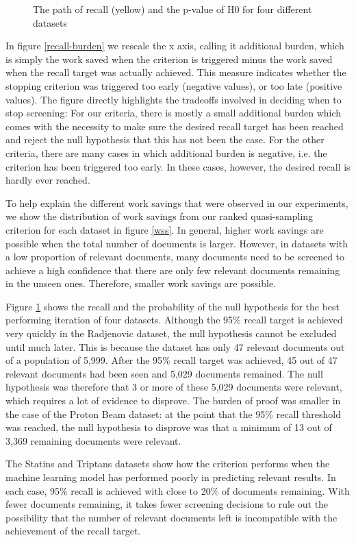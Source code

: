 \documentclass{bmcart}
\begin{document}
\begin{figure}
		\caption{\small The path of recall (yellow) and the p-value of H0 for four different datasets} 
		\label{H0paths}
	\end{figure}
	
	In figure \ref{recall-burden} we rescale the x axis, calling it additional burden, which is simply the work saved when the criterion is triggered minus the work saved when the recall target was actually achieved. This measure indicates whether the stopping criterion was triggered too early (negative values), or too late (positive values). The figure directly highlights the tradeoffs involved in deciding when to stop screening: For our criteria, there is mostly a small additional burden which comes with the necessity to make sure the desired recall target has been reached and reject the null hypothesis that this has not been the case. For the other criteria, there are many cases in which additional burden is negative, i.e. the criterion has been triggered too early. In these cases, however, the desired recall is hardly ever reached.
	
	To help explain the different work savings that were observed in our experiments, we show the distribution of work savings from our ranked quasi-sampling criterion for each dataset in figure \ref{wss}. In general, higher work savings are possible when the total number of documents is larger. However, in datasets with a low proportion of relevant documents, many documents need to be screened to achieve a high confidence that there are only few relevant documents remaining in the unseen ones. Therefore, smaller work savings are possible. 
	
	Figure \ref{H0paths} shows the recall and the probability of the null hypothesis for the best performing iteration of four datasets. Although the 95\% recall target is achieved very quickly in the Radjenovic dataset, the null hypothesis cannot be excluded until much later. This is because the dataset has only 47 relevant documents out of a population of 5,999. After the 95\% recall target was achieved, 45 out of 47 relevant documents had been seen and 5,029 documents remained. The null hypothesis was therefore that 3 or more of these 5,029 documents were relevant, which requires a lot of evidence to disprove. The burden of proof was smaller in the case of the Proton Beam dataset: at the point that the 95\% recall threshold was reached, the null hypothesis to disprove was that a minimum of 13 out of 3,369 remaining documents were relevant. 
	
	The Statins and Triptans datasets show how the criterion performs when the machine learning model has performed poorly in predicting relevant results. In each case, 95\% recall is achieved with close to 20\% of documents remaining. With fewer documents remaining, it takes fewer screening decisions to rule out the possibility that the number of relevant documents left is incompatible with the achievement of the recall target.
	
\end{document}
